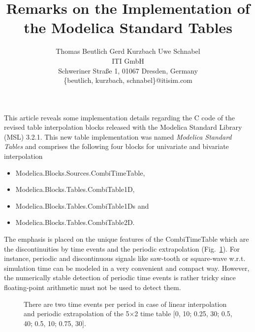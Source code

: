 \documentclass[11pt,a4paper]{article}
\begin{document}
\thispagestyle{empty}

\title{\textbf{Remarks on the Implementation of the Modelica Standard Tables}}
\author{Thomas Beutlich \quad Gerd Kurzbach \quad Uwe Schnabel\\
ITI GmbH\\
Schweriner Stra\ss{}e 1, 01067 Dresden, Germany\\
\{beutlich, kurzbach, schnabel\}@itisim.com}
\date{} %
\maketitle\thispagestyle{empty} %

This article reveals some implementation details regarding the C code of the revised table interpolation blocks released with the Mod\-el\-ica Standard Library (MSL) 3.2.1. This new table implementation was named \emph{Mod\-el\-ica Standard Tables} and comprises the following four blocks for univariate and bivariate interpolation
\begin{itemize}
\item Mod\-el\-ica.Blocks.Sources.CombiTimeTable,
\item Mod\-el\-ica.Blocks.Tables.CombiTable1D,
\item Mod\-el\-ica.Blocks.Tables.CombiTable1Ds and
\item Mod\-el\-ica.Blocks.Tables.CombiTable2D.
\end{itemize}

The emphasis is placed on the unique features of the CombiTimeTable which are the discontinuities by time events and the periodic extrapolation (Fig.~\ref{fig:2e}). For instance, periodic and discontinuous signals like saw-tooth or square-wave w.r.t. simulation time can be modeled in a very convenient and compact way. However, the numerically stable detection of periodic time events is rather tricky since floating-point arithmetic must not be used to detect them.
\begin{figure}[!htbp]
\centering
{}
\caption{There are two time events per period in case of linear interpolation and periodic extrapolation of the 5$\times$2 time table $[$0, 10; 0.25, 30; 0.5, 40; 0.5, 10; 0.75, 30$]$.}
\label{fig:2e}
\end{figure}
\end{document}
